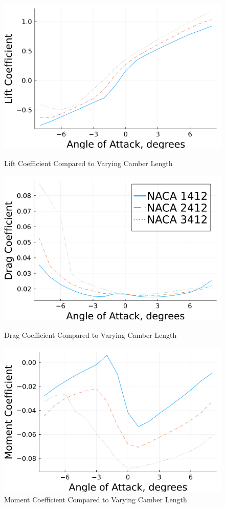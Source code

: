 \documentclass{article}
\begin{document}
\begin{figure}[!htb]
  \includegraphics[width=\linewidth]{Figure4.png}
  \caption{Lift Coefficient Compared to Varying Camber Length}\label{fig:4}
\endminipage\hfill
{}
  \includegraphics[width=\linewidth]{Figure5.png}
  \caption{Drag Coefficient Compared to Varying Camber Length}\label{fig:5}
\endminipage\hfill
{}
  \includegraphics[width=\linewidth]{Figure6.png}
  \caption{Moment Coefficient Compared to Varying Camber Length}\label{fig:6}
\endminipage
\end{figure}
\end{document}
